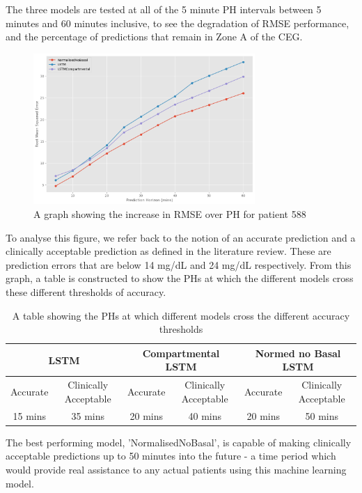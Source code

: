    The three models are tested at all of the 5 minute PH intervals between 5 minutes and 60 minutes inclusive, to see the degradation of RMSE performance, and the percentage of predictions that remain in Zone A of the CEG.

    \begin{figure}[H]
      \centering

      \includegraphics[width=0.75\textwidth]{images/AccOverPH.png}
      \caption{
       A graph showing the increase in RMSE over PH for patient 588
      }
    \end{figure}

    To analyse this figure, we refer back to the notion of an accurate prediction and a clinically acceptable prediction as defined in the literature review. These are prediction errors that are below 14 mg/dL and 24 mg/dL respectively. From this graph, a table is constructed to show the PHs at which the different models cross these different thresholds of accuracy.

    \begin{table}[H]
      \centering
      \caption{A table showing the PHs at which different models cross the different accuracy thresholds}
      \begin{tabular}{|*{6}{c|}} 
        \hline
        \multicolumn{2}{|c}{LSTM} & \multicolumn{2}{|c}{Compartmental LSTM} & \multicolumn{2}{|c|}{Normed no Basal LSTM} \\ \hline 
        Accurate & Clinically Acceptable & Accurate & Clinically Acceptable & Accurate & Clinically Acceptable \\ \hline
        15 mins&35 mins &20 mins &40 mins &20 mins & 50 mins \\ \hline
      \end{tabular}
    \end{table}

    The best performing model, 'NormalisedNoBasal', is capable of making clinically acceptable predictions up to 50 minutes into the future - a time period which would provide real assistance to any actual patients using this machine learning model. 

